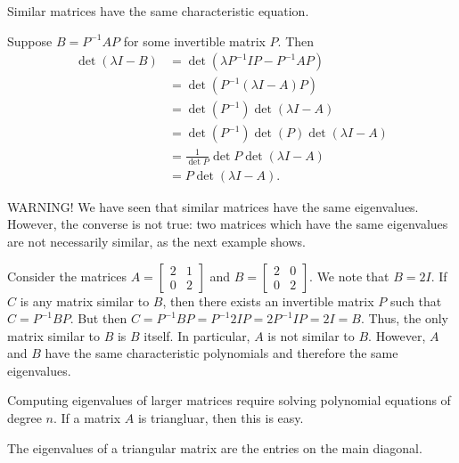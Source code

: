 \documentclass[12pt,letterpaper,reqno]{article}
\numberwithin{equation}{section}
\begin{document}
\begin{prop}
Similar matrices have the same characteristic equation.	
\end{prop}

\begin{pf}
Suppose $B=P^{-1}AP$ for some invertible matrix $P$. Then
\begin{align*}
	\det(\lambda I -B)&=\det (\lambda P^{-1}IP -P^{-1}AP) \\
	&=\det (P^{-1}(\lambda I-A)P) \\
	&=\det (P^{-1})\det(\lambda I-A) \\
	&=\det (P^{-1})\det(P)\det(\lambda I-A) \\
	&=\frac{1}{\det P}\det P\det(\lambda I-A) \\ 
	&=P\det(\lambda I-A).
\end{align*}	
\end{pf}
{\color{red} \flushleft WARNING!} We have seen that similar matrices have the same eigenvalues. However, the converse is not true: two matrices which have the same eigenvalues are not necessarily similar, as the next example shows.

\begin{example}
Consider the matrices $A=\begin{bmatrix}
	2 & 1 \\
	0 & 2
\end{bmatrix}$ and $B=\begin{bmatrix}
	2 & 0 \\ 
	0 & 2
\end{bmatrix}$. We note that $B=2I$. If $C$ is any matrix similar to $B$, then there exists an invertible matrix $P$ such that $C=P^{-1}BP$. But then $C=P^{-1}BP=P^{-1}2IP=2P^{-1}IP=2I=B$. Thus, the only matrix similar to $B$ is $B$ itself. In particular, $A$ is not similar to $B$. However, $A$ and $B$ have the same characteristic polynomials and therefore the same eigenvalues.
\end{example}

Computing eigenvalues of larger matrices require solving polynomial equations of degree $n$. If a matrix $A$ is triangluar, then this is easy.

\begin{prop}
The eigenvalues of a triangular matrix are the entries on the main diagonal.	
\end{prop}
\end{document}
